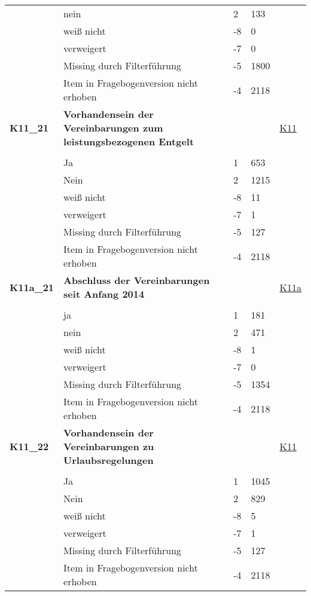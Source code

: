 \begin{longtable}{| L{2.5cm} | L{8.25cm}| C{1.5cm} | R{1.25cm} | C{2.25cm} |  }
   & nein & 2 & 133 &  \\ 
   & weiß nicht & -8 & 0 &  \\ 
   & verweigert & -7 & 0 &  \\ 
   & Missing durch Filterführung & -5 & 1800 &  \\ 
   & Item in Fragebogenversion nicht erhoben & -4 & 2118 &  \\ 
   \midrule
\textbf{K11\_21}\label{var:suf:K11:21} & \textbf{Vorhandensein der Vereinbarungen zum leistungsbezogenen Entgelt} &  &  & \hyperref[K11]{K11} \\ 
   &  &  &  &  \\ 
   & Ja & 1 & 653 &  \\ 
   & Nein & 2 & 1215 &  \\ 
   & weiß nicht & -8 & 11 &  \\ 
   & verweigert & -7 & 1 &  \\ 
   & Missing durch Filterführung & -5 & 127 &  \\ 
   & Item in Fragebogenversion nicht erhoben & -4 & 2118 &  \\ 
   \midrule
\textbf{K11a\_21}\label{var:suf:K11a:21} & \textbf{Abschluss der Vereinbarungen seit Anfang 2014} &  &  & \hyperref[K11a]{K11a} \\ 
   &  &  &  &  \\ 
   & ja & 1 & 181 &  \\ 
   & nein & 2 & 471 &  \\ 
   & weiß nicht & -8 & 1 &  \\ 
   & verweigert & -7 & 0 &  \\ 
   & Missing durch Filterführung & -5 & 1354 &  \\ 
   & Item in Fragebogenversion nicht erhoben & -4 & 2118 &  \\ 
   \midrule
\textbf{K11\_22}\label{var:suf:K11:22} & \textbf{Vorhandensein der Vereinbarungen zu Urlaubsregelungen} &  &  & \hyperref[K11]{K11} \\ 
   &  &  &  &  \\ 
   & Ja & 1 & 1045 &  \\ 
   & Nein & 2 & 829 &  \\ 
   & weiß nicht & -8 & 5 &  \\ 
   & verweigert & -7 & 1 &  \\ 
   & Missing durch Filterführung & -5 & 127 &  \\ 
   & Item in Fragebogenversion nicht erhoben & -4 & 2118 &  \\ 

\end{longtable}
